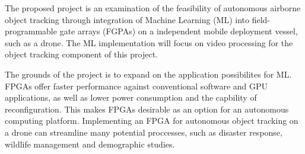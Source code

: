 The proposed project is an examination of the feasibility of autonomous airborne
object tracking through integration of Machine Learning (ML) into field-programmable
gate arrays (FGPAs) on a independent mobile deployment vessel, such as a drone.
The ML implementation will focus on video processing for the object tracking component
of this project.

The grounds of the project is to expand on the application possibilites for ML. FPGAs
offer faster performance against conventional software and GPU applications, as well as
lower power consumption and the capbility of reconfiguration. This makes FPGAs desirable 
as an option for an autonomous computing platform. Implementing an FPGA for autonomous
object tracking on a drone can streamline many potential proccesses, such as disaster
response, wildlife management and demographic studies.
